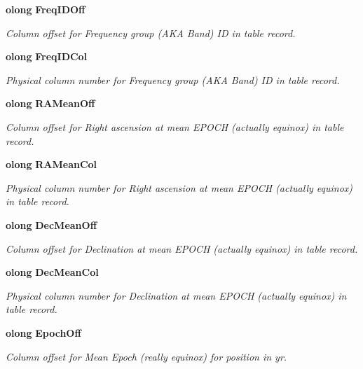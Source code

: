 \begin{CompactItemize}
{\bf olong} {\bf Freq\-IDOff}
\begin{CompactList}\small\item\em Column offset for Frequency group (AKA Band) ID in table record. \item\end{CompactList}\item 
{\bf olong} {\bf Freq\-IDCol}
\begin{CompactList}\small\item\em Physical column number for Frequency group (AKA Band) ID in table record. \item\end{CompactList}\item 
{\bf olong} {\bf RAMean\-Off}
\begin{CompactList}\small\item\em Column offset for Right ascension at mean EPOCH (actually equinox) in table record. \item\end{CompactList}\item 
{\bf olong} {\bf RAMean\-Col}
\begin{CompactList}\small\item\em Physical column number for Right ascension at mean EPOCH (actually equinox) in table record. \item\end{CompactList}\item 
{\bf olong} {\bf Dec\-Mean\-Off}
\begin{CompactList}\small\item\em Column offset for Declination at mean EPOCH (actually equinox) in table record. \item\end{CompactList}\item 
{\bf olong} {\bf Dec\-Mean\-Col}
\begin{CompactList}\small\item\em Physical column number for Declination at mean EPOCH (actually equinox) in table record. \item\end{CompactList}\item 
{\bf olong} {\bf Epoch\-Off}
\begin{CompactList}\small\item\em Column offset for Mean Epoch (really equinox) for position in yr. \item\end{CompactList}\item 

\end{CompactItemize}
